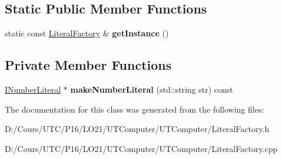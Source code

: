 \subsection*{Static Public Member Functions}
\begin{DoxyCompactItemize}
\item 
static const \hyperlink{class_literal_factory}{Literal\+Factory} \& {\bfseries get\+Instance} ()\hypertarget{class_literal_factory_aec9768d18ca1f1b46c9718825be9f364}{}\label{class_literal_factory_aec9768d18ca1f1b46c9718825be9f364}

\end{DoxyCompactItemize}
\subsection*{Private Member Functions}
\begin{DoxyCompactItemize}
\item 
\hyperlink{class_i_number_literal}{I\+Number\+Literal} $\ast$ {\bfseries make\+Number\+Literal} (std\+::string str) const \hypertarget{class_literal_factory_abdfc288d8f0d4c869e0fbb21f08223e4}{}\label{class_literal_factory_abdfc288d8f0d4c869e0fbb21f08223e4}

\end{DoxyCompactItemize}


The documentation for this class was generated from the following files\+:\begin{DoxyCompactItemize}
\item 
D\+:/\+Cours/\+U\+T\+C/\+P16/\+L\+O21/\+U\+T\+Computer/\+U\+T\+Computer/Literal\+Factory.\+h\item 
D\+:/\+Cours/\+U\+T\+C/\+P16/\+L\+O21/\+U\+T\+Computer/\+U\+T\+Computer/Literal\+Factory.\+cpp\end{DoxyCompactItemize}
